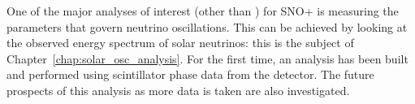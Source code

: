 One of the major analyses of interest (other than \onbb{}) for SNO+ is measuring the parameters that govern neutrino oscillations. This can be achieved by looking at the observed energy spectrum of \beight{} solar neutrinos: this is the subject of Chapter~\ref{chap:solar_osc_analysis}. For the first time, an analysis has been built and performed using scintillator phase data from the detector. The future prospects of this analysis as more data is taken are also investigated.